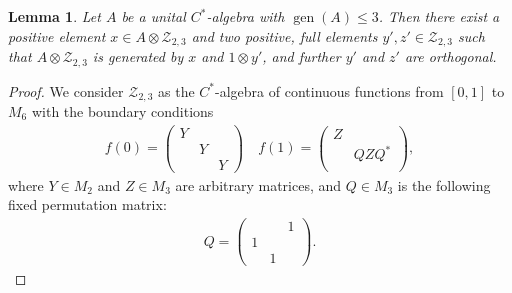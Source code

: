 \documentclass{amsart}
\newtheorem{lma}{Lemma}[section]
\theoremstyle{definition}
\begin{document}
\begin{lma}
\label{lma:Reducing_by_1}
    Let $A$ be a unital {{$C^*$-al\-ge\-bra}}{} with $\operatorname{gen}(A)\leq 3$.
    Then there exist a positive element $x\in A\otimes\mathcal{Z}_{2,3}$ and two positive, full elements $y',z'\in \mathcal{Z}_{2,3}$ such that $A\otimes\mathcal{Z}_{2,3}$ is generated by $x$ and $1\otimes y'$, and further $y'$ and $z'$ are orthogonal.
\end{lma}
\begin{proof}
    We consider $\mathcal{Z}_{2,3}$ as the {{$C^*$-al\-ge\-bra}}{} of continuous functions from $[0,1]$ to $M_6$ with the boundary conditions
    \begin{align*}
        f(0)=\begin{pmatrix}
            Y \\
            & Y \\
            & & Y
        \end{pmatrix}
        \quad
        f(1)=\begin{pmatrix}
            Z \\
            & QZQ^* \\
        \end{pmatrix},
    \end{align*}
    where $Y\in M_2$ and $Z\in M_3$ are arbitrary matrices, and $Q\in M_3$ is the following fixed permutation matrix:
    \begin{align*}
        Q=\begin{pmatrix}
            & & 1 \\
            1 \\
            & 1
        \end{pmatrix}.
    \end{align*}


\end{proof}
\end{document}

